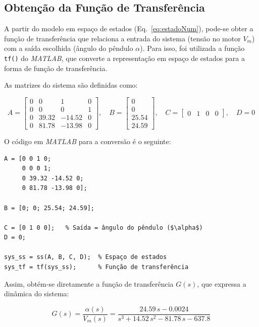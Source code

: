 \documentclass[9pt,a4paper,twocolumn,twoside]{tau-class/tau}
\begin{document}
\subsection{Obtenção da Função de Transferência}

A partir do modelo em espaço de estados (Eq.~\ref{eq:estadoNum}), pode-se obter a 
função de transferência que relaciona a entrada do sistema (tensão no motor $V_m$) 
com a saída escolhida (ângulo do pêndulo $\alpha$). Para isso, foi utilizada a 
função \texttt{tf()} do \textit{MATLAB}, que converte a representação em espaço 
de estados para a forma de função de transferência.

As matrizes do sistema são definidas como:

\begin{equation}
A =
\begin{bmatrix}
0 & 0 & 1 & 0 \\
0 & 0 & 0 & 1 \\
0 & 39.32 & -14.52 & 0 \\
0 & 81.78 & -13.98 & 0
\end{bmatrix}, \quad
B =
\begin{bmatrix}
0 \\ 0 \\ 25.54 \\ 24.59
\end{bmatrix}, \quad
C =
\begin{bmatrix}
0 & 1 & 0 & 0
\end{bmatrix}, \quad
D = 0
\end{equation}

O código em \textit{MATLAB} para a conversão é o seguinte:

\begin{verbatim}
A = [0 0 1 0;
     0 0 0 1;
     0 39.32 -14.52 0;
     0 81.78 -13.98 0];

B = [0; 0; 25.54; 24.59];

C = [0 1 0 0];   % Saída = ângulo do pêndulo ($\alpha$)
D = 0;

sys_ss = ss(A, B, C, D);  % Espaço de estados
sys_tf = tf(sys_ss);      % Função de transferência
\end{verbatim}

Assim, obtém-se diretamente a função de transferência $G(s)$, que expressa a 
dinâmica do sistema:

\begin{equation}
    G(s) = \frac{\alpha(s)}{V_m(s)}
          = \frac{24.59\,s - 0.0024}{s^3 + 14.52\,s^2 - 81.78\,s - 637.8}
\end{equation}
\end{document}

